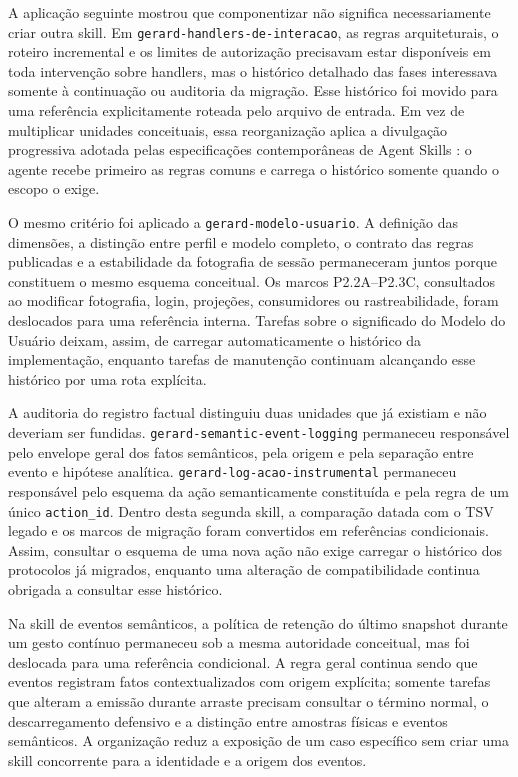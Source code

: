 \documentclass[preprint,12pt,authoryear]{elsarticle}
\begin{document}
A aplicação seguinte mostrou que componentizar não significa necessariamente criar outra skill. Em \texttt{gerard-handlers-de-interacao}, as regras arquiteturais, o roteiro incremental e os limites de autorização precisavam estar disponíveis em toda intervenção sobre handlers, mas o histórico detalhado das fases interessava somente à continuação ou auditoria da migração. Esse histórico foi movido para uma referência explicitamente roteada pelo arquivo de entrada. Em vez de multiplicar unidades conceituais, essa reorganização aplica a divulgação progressiva adotada pelas especificações contemporâneas de Agent Skills \citep{openai2026skills,microsoft2026skills}: o agente recebe primeiro as regras comuns e carrega o histórico somente quando o escopo o exige.

O mesmo critério foi aplicado a \texttt{gerard-modelo-usuario}. A definição das dimensões, a distinção entre perfil e modelo completo, o contrato das regras publicadas e a estabilidade da fotografia de sessão permaneceram juntos porque constituem o mesmo esquema conceitual. Os marcos P2.2A--P2.3C, consultados ao modificar fotografia, login, projeções, consumidores ou rastreabilidade, foram deslocados para uma referência interna. Tarefas sobre o significado do Modelo do Usuário deixam, assim, de carregar automaticamente o histórico da implementação, enquanto tarefas de manutenção continuam alcançando esse histórico por uma rota explícita.

A auditoria do registro factual distinguiu duas unidades que já existiam e não deveriam ser fundidas. \texttt{gerard-semantic-event-logging} permaneceu responsável pelo envelope geral dos fatos semânticos, pela origem e pela separação entre evento e hipótese analítica. \texttt{gerard-log-acao-instrumental} permaneceu responsável pelo esquema da ação semanticamente constituída e pela regra de um único \texttt{action\_id}. Dentro desta segunda skill, a comparação datada com o TSV legado e os marcos de migração foram convertidos em referências condicionais. Assim, consultar o esquema de uma nova ação não exige carregar o histórico dos protocolos já migrados, enquanto uma alteração de compatibilidade continua obrigada a consultar esse histórico.

Na skill de eventos semânticos, a política de retenção do último snapshot durante um gesto contínuo permaneceu sob a mesma autoridade conceitual, mas foi deslocada para uma referência condicional. A regra geral continua sendo que eventos registram fatos contextualizados com origem explícita; somente tarefas que alteram a emissão durante arraste precisam consultar o término normal, o descarregamento defensivo e a distinção entre amostras físicas e eventos semânticos. A organização reduz a exposição de um caso específico sem criar uma skill concorrente para a identidade e a origem dos eventos.
\end{document}
